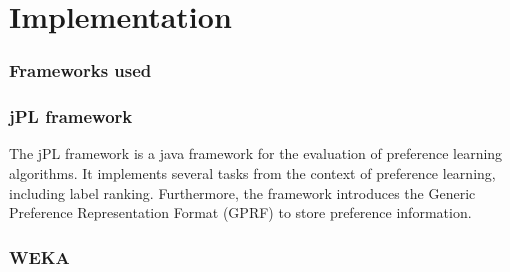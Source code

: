 %
\chapter{Implementation}
\label{sec:implementation}

\subsection{Frameworks used}


\subsection{jPL framework}
The jPL framework is a java framework for the evaluation of preference learning algorithms. It implements several tasks from the context of preference learning, including label ranking. Furthermore, the framework introduces the Generic Preference Representation Format (GPRF) to store preference information.

\subsection{WEKA}

